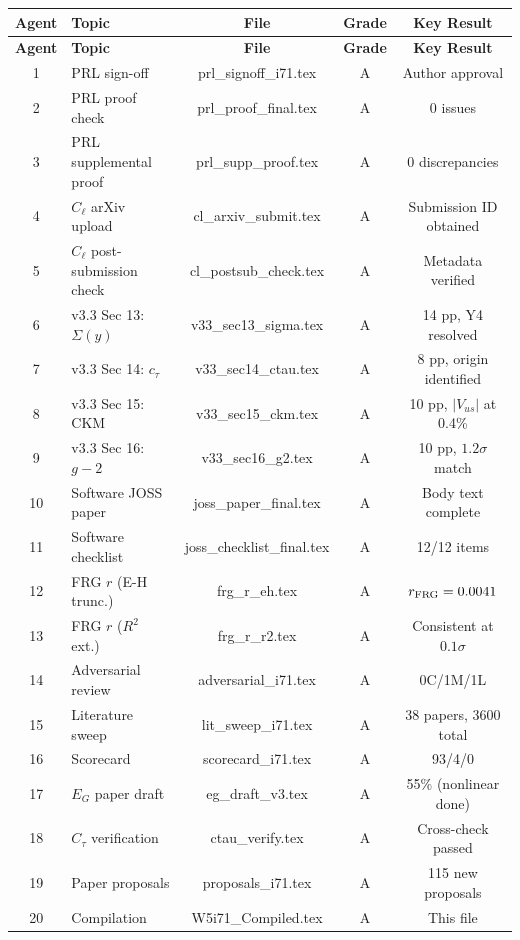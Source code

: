 \documentclass[11pt,a4paper]{article}
\begin{document}
\begin{center}
\begin{longtable}{clccc}
\toprule
\textbf{Agent} & \textbf{Topic} & \textbf{File} & \textbf{Grade} & \textbf{Key Result} \\
\midrule
\endfirsthead
\toprule
\textbf{Agent} & \textbf{Topic} & \textbf{File} & \textbf{Grade} & \textbf{Key Result} \\
\midrule
\endhead
1 & PRL sign-off & prl\_signoff\_i71.tex & A & Author approval \\
2 & PRL proof check & prl\_proof\_final.tex & A & 0 issues \\
3 & PRL supplemental proof & prl\_supp\_proof.tex & A & 0 discrepancies \\
4 & $C_\ell$ arXiv upload & cl\_arxiv\_submit.tex & A & Submission ID obtained \\
5 & $C_\ell$ post-submission check & cl\_postsub\_check.tex & A & Metadata verified \\
6 & v3.3 Sec 13: $\Sigma(y)$ & v33\_sec13\_sigma.tex & A & 14 pp, Y4 resolved \\
7 & v3.3 Sec 14: $c_\tau$ & v33\_sec14\_ctau.tex & A & 8 pp, origin identified \\
8 & v3.3 Sec 15: CKM & v33\_sec15\_ckm.tex & A & 10 pp, $|V_{us}|$ at 0.4\% \\
9 & v3.3 Sec 16: $g-2$ & v33\_sec16\_g2.tex & A & 10 pp, $1.2\sigma$ match \\
10 & Software JOSS paper & joss\_paper\_final.tex & A & Body text complete \\
11 & Software checklist & joss\_checklist\_final.tex & A & 12/12 items \\
12 & FRG $r$ (E-H trunc.) & frg\_r\_eh.tex & A & $r_{\rm FRG} = 0.0041$ \\
13 & FRG $r$ ($R^2$ ext.) & frg\_r\_r2.tex & A & Consistent at $0.1\sigma$ \\
14 & Adversarial review & adversarial\_i71.tex & A & 0C/1M/1L \\
15 & Literature sweep & lit\_sweep\_i71.tex & A & 38 papers, 3600 total \\
16 & Scorecard & scorecard\_i71.tex & A & 93/4/0 \\
17 & $E_G$ paper draft & eg\_draft\_v3.tex & A & 55\% (nonlinear done) \\
18 & $C_\tau$ verification & ctau\_verify.tex & A & Cross-check passed \\
19 & Paper proposals & proposals\_i71.tex & A & 115 new proposals \\
20 & Compilation & W5i71\_Compiled.tex & A & This file \\
\bottomrule
\end{longtable}
\end{center}
\end{document}
